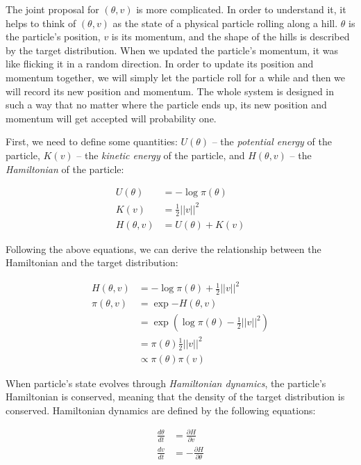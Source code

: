 \documentclass[12pt]{article}
\begin{document}
The joint proposal for $(\theta, v)$ is more complicated. In order to understand it, it helps to think of $(\theta, v)$ as the state of a physical particle rolling along a hill. $\theta$ is the particle's position, $v$ is its momentum, and the shape of the hills is described by the target distribution. When we updated the particle's momentum, it was like flicking it in a random direction. In order to update its position and momentum together, we will simply let the particle roll for a while and then we will record its new position and momentum. The whole system is designed in such a way that no matter where the particle ends up, its new position and momentum will get accepted will probability one.

First, we need to define some quantities: $U(\theta)$ -- the \textit{potential energy} of the particle, $K(v)$ -- the \textit{kinetic energy} of the particle, and $H(\theta, v)$ -- the \textit{Hamiltonian} of the particle:

\begin{align}
U(\theta) &= -\log \pi(\theta) \\
K(v) &= \frac{1}{2} ||v||^2 \\
H(\theta, v) &= U(\theta) + K(v)
\end{align}
\label{eq_hamiltonian}

Following the above equations, we can derive the relationship between the Hamiltonian and the target distribution:

\begin{align}
H(\theta, v) &= -\log \pi(\theta) + \frac{1}{2}||v||^2 \\
\pi(\theta, v) &= \exp {-H(\theta, v)} \\
&= \exp \left(\log \pi(\theta) - \frac{1}{2}||v||^2 \right) \\
&= \pi(\theta) \frac{1}{2}||v||^2 \\
&\propto \pi(\theta) \pi(v)
\end{align}

When particle's state evolves through \textit{Hamiltonian dynamics}, the particle's Hamiltonian is conserved, meaning that the density of the target distribution is conserved. Hamiltonian dynamics are defined by the following equations:

\begin{align}
\frac{d\theta}{dt} &= \frac{\partial H}{\partial v} \\
\frac{dv}{dt} &= -\frac{\partial H}{\partial \theta}
\end{align}
\label{eq_ham_dynamics}
\end{document}
